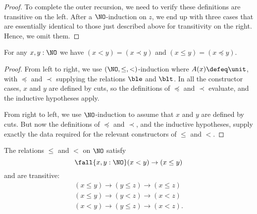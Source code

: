 \begin{proof}
  To complete the outer recursion, we need to verify these definitions are transitive on the left.
  After a $\NO$-induction on $z$, we end up with three cases that are essentially identical to those just described above for transitivity on the right.
  Hence, we omit them.
\end{proof}

\begin{thm}\label{thm:NO-encode-decode}
  For any $x,y:\NO$ we have $(x<y)=(x\prec y)$ and $(x\le y)=(x\preceq y)$.
\end{thm}
\begin{proof}
  From left to right, we use $(\NO,\le,<)$-induction where $A(x)\defeq\unit$, with $\preceq$ and $\prec$ supplying the relations $\ble$ and $\blt$.
  In all the constructor cases, $x$ and $y$ are defined by cuts, so the definitions of $\preceq$ and $\prec$ evaluate, and the inductive hypotheses apply.

  From right to left, we use $\NO$-induction to assume that $x$ and $y$ are defined by cuts.
  But now the definitions of $\preceq$ and $\prec$, and the inductive hypotheses, supply exactly the data required for the relevant constructors of $\le$ and $<$.
\end{proof}

\begin{cor}\label{thm:NO-unstrict-transitive}
  The relations $\le$ and $<$ on $\NO$ satisfy
  \[ \fall{x,y:\NO} (x<y) \to (x\le y) \]
  and are transitive:
  \begin{gather*}
    (x\le y) \to (y\le z) \to (x\le z)\\
    (x\le y) \to (y< z) \to (x< z)\\
    (x< y) \to (y\le z) \to (x< z).
  \end{gather*}
\end{cor}


